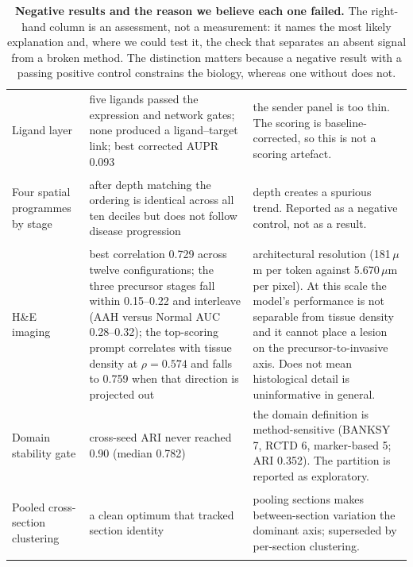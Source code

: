 \begin{table}[!ht]
\begin{tabularx}{\textwidth}{@{}>{\itshape\raggedright\arraybackslash}p{94pt}>{\raggedright\arraybackslash}p{152pt}X@{}}
\addlinespace[2pt]
Ligand layer & five ligands passed the expression and network gates; none produced a ligand--target link; best corrected AUPR 0.093 & the sender panel is too thin. The scoring is baseline-corrected, so this is not a scoring artefact. \\
\addlinespace[2pt]
Four spatial programmes by stage & after depth matching the ordering is identical across all ten deciles but does not follow disease progression & depth creates a spurious trend. Reported as a negative control, not as a result. \\
\addlinespace[2pt]
H\&E imaging & best correlation 0.729 across twelve configurations; the three precursor stages fall within 0.15--0.22 and interleave (AAH versus Normal AUC 0.28--0.32); the top-scoring prompt correlates with tissue density at $\rho=0.574$ and falls to 0.759 when that direction is projected out & architectural resolution (181\,$\mu$m per token against 5.670\,$\mu$m per pixel). At this scale the model's performance is not separable from tissue density and it cannot place a lesion on the precursor-to-invasive axis. Does not mean histological detail is uninformative in general. \\
\addlinespace[2pt]
Domain stability gate & cross-seed ARI never reached 0.90 (median 0.782) & the domain definition is method-sensitive (BANKSY 7, RCTD 6, marker-based 5; ARI 0.352). The partition is reported as exploratory. \\
\addlinespace[2pt]
Pooled cross-section clustering & a clean optimum that tracked section identity & pooling sections makes between-section variation the dominant axis; superseded by per-section clustering. \\
\bottomrule
\end{tabularx}
\caption{\textbf{Negative results and the reason we believe each one failed.} The right-hand
column is an assessment, not a measurement: it names the most likely explanation and, where
we could test it, the check that separates an absent signal from a broken method. The
distinction matters because a negative result with a passing positive control constrains the
biology, whereas one without does not.}
\label{tab:negatives}
\end{table}
